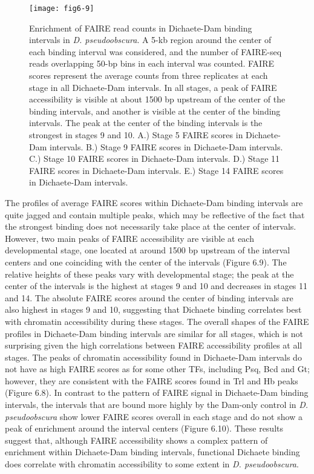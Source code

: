 \begin{figure}
\centering
\texttt{[image: fig6-9]}
\caption[Enrichment of FAIRE read counts in Dichaete-Dam binding intervals in \emph{D. pseudoobscura}]{Enrichment of FAIRE read counts in Dichaete-Dam binding intervals in \emph{D. pseudoobscura}. A 5-kb region around the center of each binding interval was considered, and the number of FAIRE-seq reads overlapping 50-bp bins in each interval was counted. FAIRE scores represent the average counts from three replicates at each stage in all Dichaete-Dam intervals. In all stages, a peak of FAIRE accessibility is visible at about 1500 bp upstream of the center of the binding intervals, and another is visible at the center of the binding intervals. The peak at the center of the binding intervals is the strongest in stages 9 and 10. A.) Stage 5 FAIRE scores in Dichaete-Dam intervals. B.) Stage 9 FAIRE scores in Dichaete-Dam intervals. C.) Stage 10 FAIRE scores in Dichaete-Dam intervals. D.) Stage 11 FAIRE scores in Dichaete-Dam intervals. E.) Stage 14 FAIRE scores in Dichaete-Dam intervals.}
\label{Figure 6.9}
\end{figure}

The profiles of average FAIRE scores within Dichaete-Dam binding intervals are quite jagged and contain multiple peaks, which may be reflective of the fact that the strongest binding does not necessarily take place at the center of intervals. However, two main peaks of FAIRE accessibility are visible at each developmental stage, one located at around 1500 bp upstream of the interval centers and one coinciding with the center of the intervals (Figure 6.9). The relative heights of these peaks vary with developmental stage; the peak at the center of the intervals is the highest at stages 9 and 10 and decreases in stages 11 and 14. The absolute FAIRE scores around the center of binding intervals are also highest in stages 9 and 10, suggesting that Dichaete binding correlates best with chromatin accessibility during these stages. The overall shapes of the FAIRE profiles in Dichaete-Dam binding intervals are similar for all stages, which is not surprising given the high correlations between FAIRE accessibility profiles at all stages. The peaks of chromatin accessibility found in Dichaete-Dam intervals do not have as high FAIRE scores as for some other TFs, including Psq, Bcd and Gt; however, they are consistent with the FAIRE scores found in Trl and Hb peaks (Figure 6.8). In contrast to the pattern of FAIRE signal in Dichaete-Dam binding intervals, the intervals that are bound more highly by the Dam-only control in \emph{D. pseudoobscura} show lower FAIRE scores overall in each stage and do not show a peak of enrichment around the interval centers (Figure 6.10). These results suggest that, although FAIRE accessibility shows a complex pattern of enrichment within Dichaete-Dam binding intervals, functional Dichaete binding does correlate with chromatin accessibility to some extent in \emph{D. pseudoobscura}.

